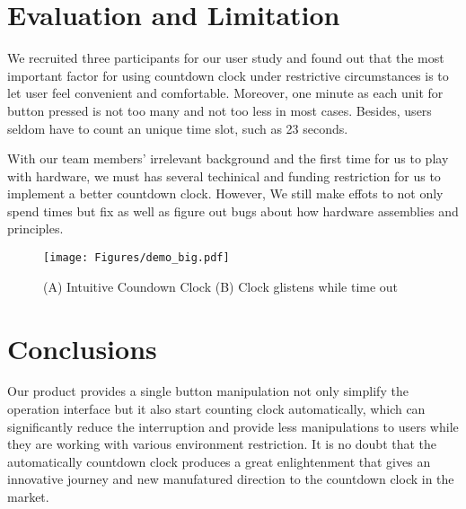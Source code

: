 \documentclass{sig-alternate-ipsn13}
\begin{document}

\section{Evaluation and Limitation}
We recruited three participants for our user study and found out that the most important factor for using countdown clock under restrictive circumstances is to let user feel convenient and comfortable. Moreover, one minute as each unit for button pressed is not too many and not too less in most cases. Besides, users seldom have to count an unique time slot, such as 23 seconds.

With our team members' irrelevant background and the first time for us to play with hardware, we must has several techinical and funding restriction for us to implement a better countdown clock. However, We still make effots to not only spend times but fix as well as figure out bugs about how hardware assemblies and principles.


\begin{figure}
  \centering
  \texttt{[image: Figures/demo\_big.pdf]}
  \caption{(A) Intuitive Coundown Clock (B) Clock glistens while time out}
  \label{fig:demo1}
\end{figure}

\section{Conclusions}
Our product provides a single button manipulation not only simplify the operation interface but it also start counting clock automatically, which can significantly reduce the interruption and provide less manipulations to users while they are working with various environment restriction.
It is no doubt that the automatically countdown clock produces a great enlightenment that gives an innovative journey and new manufatured direction to the countdown clock in the market.
\end{document}

